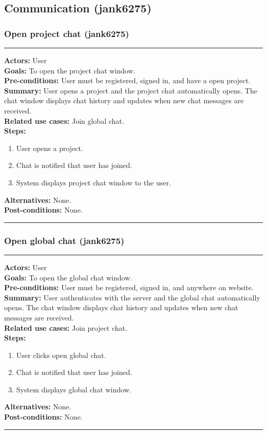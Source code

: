 \documentclass[11pt]{report}
\begin{document}
\subsection{Communication (jank6275)}
\subsubsection{Open project chat (jank6275)}
\vspace{2pt}
\hrule
\vspace{8pt}
 \textbf{Actors:} User \\ 
 \textbf{Goals:} To open the project chat window. \\
 \textbf{Pre-conditions:} User must be registered, signed in, and have a open project.  \\
 \textbf{Summary:} User opens a project and the project chat automatically opens. The chat window displays chat history and updates when new chat messages are received. \\ 
 \textbf{Related use cases:} Join global chat. \\ 
 \textbf{Steps:} \begin{enumerate}
  \item User opens a project.
  \item Chat is notified that user has joined.
  \item System displays project chat window to the user.
 \end{enumerate}
 \textbf{Alternatives:} None. \\
 \textbf{Post-conditions:} None. \\
 \vspace{8pt}
\hrule
\newpage
\subsubsection{Open global chat (jank6275)}
\vspace{2pt}
\hrule
\vspace{8pt}
 \textbf{Actors:} User \\ 
 \textbf{Goals:} To open the global chat window. \\
 \textbf{Pre-conditions:} User must be registered, signed in, and anywhere on website.  \\
 \textbf{Summary:} User authenticates with the server and the global chat automatically opens. The chat window displays chat history and updates when new chat messages are received.  \\ 
 \textbf{Related use cases:} Join project chat. \\ 
 \textbf{Steps:} \begin{enumerate}
  \item User clicks open global chat.
  \item Chat is notified that user has joined.
  \item System displays global chat window.
 \end{enumerate}
 \textbf{Alternatives:} None. \\
 \textbf{Post-conditions:} None. \\
 \vspace{8pt}
\hrule
\newpage
\end{document}
